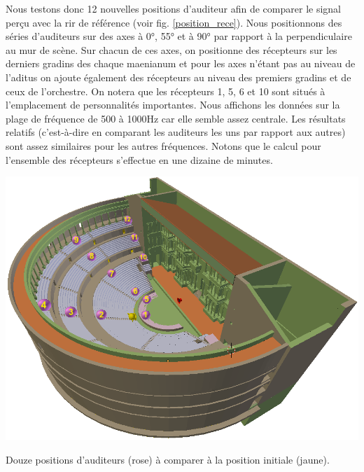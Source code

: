 Nous testons donc 12 nouvelles positions d'auditeur afin de comparer le signal perçu avec la \gls{rir} de référence (voir fig. \ref{position_rece}). Nous positionnons des séries d'auditeurs sur des axes à 0°, 55° et à 90° par rapport à la perpendiculaire au mur de scène. Sur chacun de ces axes, on positionne des récepteurs sur les derniers gradins des chaque \gls{maenianum} et pour les axes n'étant pas au niveau de l'\gls{aditus} on ajoute également des récepteurs au niveau des premiers gradins et de ceux de l'orchestre. On notera que les récepteurs 1, 5, 6 et 10 sont situés à l'emplacement de personnalités importantes. Nous affichons les données sur la plage de fréquence de 500 à 1000Hz car elle semble assez centrale. Les résultats relatifs (c'est-à-dire en comparant les auditeurs les uns par rapport aux autres) sont assez similaires pour les autres fréquences. Notons que le calcul pour l'ensemble des récepteurs s'effectue en une dizaine de minutes.
\begin{figureth}
	\includegraphics[width=\linewidth]{images/position_rece}
	\caption{Douze positions d'auditeurs (rose) à comparer à la position initiale (jaune).}
	\label{position_rece}
\end{figureth}
%
